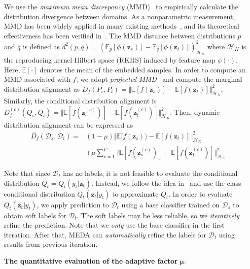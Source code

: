 \documentclass[sigconf]{acmart}
\begin{document}
We use the \textit{maximum mean discrepancy} (MMD)~\cite{ben2007analysis} to empirically calculate the distribution divergence between domains. As a nonparametric measurement, MMD has been widely applied in many existing methods~\cite{zhang2017joint,ghifary2017scatter,pan2011domain}, and its theoretical effectiveness has been verified in~\cite{gretton2012kernel}. The MMD distance between distributions $p$ and $q$ is defined as $d^2(p,q)=(\mathbb{E}_p[\phi(\mathbf{z}_s)] - \mathbb{E}_q[\phi(\mathbf{z}_t)])^2_{\mathcal{H}_{K}}$ where $\mathcal{H}_{K}$ is the reproducing kernel Hilbert space (RKHS) induced by feature map $\phi(\cdot)$. Here, $\mathbb{E}[\cdot]$ denotes the mean of the embedded samples. In order to compute an MMD associated with $f$, we adopt \textit{projected MMD}~\cite{quanz2009large} and compute the marginal distribution alignment as $D_f(P_s,P_t)=\Vert\mathbb{E}[f(\mathbf{z}_s)] - \mathbb{E}[f(\mathbf{z}_t)]\Vert^2_{\mathcal{H}_{K}}$. Similarly, the conditional distribution alignment is $D^{(c)}_f(Q_s,Q_t)=\Vert \mathbb{E}[f(\mathbf{z}^{(c)}_s)] - \mathbb{E}[f(\mathbf{z}^{(c)}_t)]\Vert^2_{\mathcal{H}_{K}}$. Then, dynamic distribution alignment can be expressed as
\begin{equation}
	\label{equ-da1}
	\begin{split}
		\overline{D_{f}}(\mathcal{D}_s,\mathcal{D}_t) = &(1 - \mu) \Vert\mathbb{E}[f(\mathbf{z}_s)) - \mathbb{E}[f(\mathbf{z}_t)]\Vert^2_{\mathcal{H}_{K}} \\
		&+ \mu \sum_{c=1}^{C}\Vert \mathbb{E}[f(\mathbf{z}^{(c)}_s)] - \mathbb{E}[f(\mathbf{z}^{(c)}_t)]\Vert^2_{\mathcal{H}_{K}}
	\end{split}
\end{equation}

Note that since $\mathcal{D}_t$ has no labels, it is not feasible to evaluate the conditional distribution $Q_t=Q_t(y_t|\mathbf{z}_t)$. Instead, we follow the idea in~\cite{wang2017balanced} and use the class conditional distribution $Q_t(\mathbf{z}_t|y_t)$ to approximate $Q_t$. In order to evaluate $Q_t(\mathbf{z}_t|y_t)$, we apply prediction to $\mathcal{D}_t$ using a base classifier trained on $\mathcal{D}_s$ to obtain soft labels for $\mathcal{D}_t$. The soft labels may be less reliable, so we \textit{iteratively} refine the prediction. Note that we \textit{only} use the base classifier in the first iteration. After that, MEDA can \textit{automatically} refine the labels for $\mathcal{D}_t$ using results from previous iteration.

\textbf{The quantitative evaluation of the adaptive factor} $\bm{\mu}$:
\end{document}
